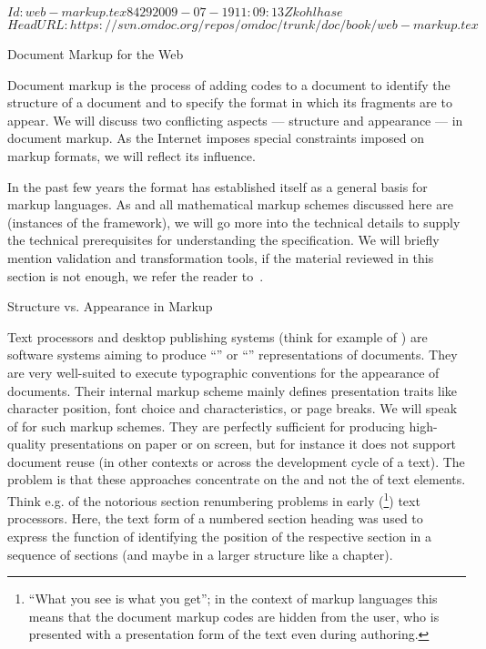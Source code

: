 \svnInfo $Id: web-markup.tex 8429 2009-07-19 11:09:13Z kohlhase $
\svnKeyword $HeadURL: https://svn.omdoc.org/repos/omdoc/trunk/doc/book/web-markup.tex $

\begin{omgroup}[id=markup-web]{Document Markup for the Web}

Document markup is the process of adding codes to a document to identify the
structure of a document and to specify the format in which its fragments are to
appear. We will discuss two conflicting aspects --- structure and appearance ---
in document markup. As the Internet imposes special constraints imposed on markup
formats, we will reflect its influence.

In the past few years the {\xml} format has established itself as a general basis for
markup languages. As {\omdoc} and all mathematical markup schemes discussed here are
 (instances of the
 framework), we will go more into the technical details to
supply the technical prerequisites for understanding the specification.  We will briefly
mention {\xml} validation and transformation tools, if the material reviewed in this
section is not enough, we refer the reader to~\cite{Harold:xb01}.

\begin{omgroup}[id=markup-types]{Structure vs. Appearance in Markup}

  Text processors and desktop publishing systems (think for example of
  {}) are software systems aiming to produce
  ``{}'' or ``{}'' representations of documents.
  They are very well-suited to execute typographic conventions for the appearance of
  documents. Their internal markup scheme mainly defines presentation traits like
  character position, font choice and characteristics, or page breaks.  We will speak of
  {} for such markup schemes.  They are perfectly sufficient
  for producing high-quality presentations on paper or on screen, but for instance it does
  not support document reuse (in other contexts or across the development cycle of a
  text). The problem is that these approaches concentrate on the {} and not the
  {} of text elements.  Think e.g. of the notorious section renumbering
  problems in early ({}\footnote{``What you see is what you get''; in
    the context of markup languages this means that the document markup codes are hidden
    from the user, who is presented with a presentation form of the text even during
    authoring.}) text processors.  Here, the text form of a numbered section heading was
  used to express the function of identifying the position of the respective section in a
  sequence of sections (and maybe in a larger structure like a chapter).


\end{omgroup}
\end{omgroup}

